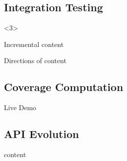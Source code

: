 \subsection{Integration Testing}
\begin{frame}<3>{\insertsubsection}
	\slideStagesTesting
\end{frame}

\begin{frame}{Incremental \insertsubsection}
	content
\end{frame}

\begin{frame}{Directions of \insertsubsection}
	content
\end{frame}

\subsection{Coverage Computation}
\begin{frame}{\insertsubsection}
	Live Demo
\end{frame}


\subsection{API Evolution}
\begin{frame}{\insertsubsection}
	content
\end{frame}


